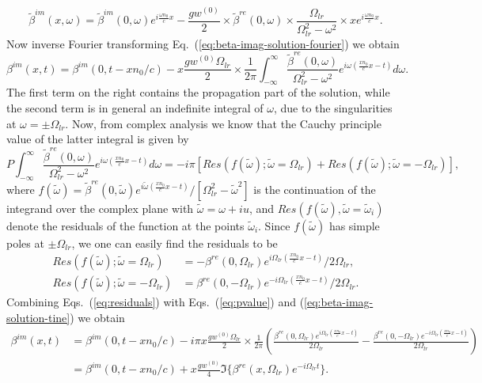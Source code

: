 \documentclass[onecolumn,secnumarabic,amssymb, nobibnotes, aip, prd]{revtex4-1}
\def\t{\tilde}
\def\om{\omega}
\begin{document}
\begin{appendices}
\begin{equation}
\label{eq:beta-imag-solution-fourier}
\t\beta^{im}(x,\om) = \t\beta^{im}(0,\om)e^{i\frac{\om n_0}{c}x} -\frac{g w^{(0)} }{2}\times  \t\beta^{re}(0,\om) \times\frac{\Omega_{lr}}{\Omega_{lr}^2-\om^2}\times x e^{i\frac{\om n_0}{c}x}.
\end{equation}
Now inverse Fourier transforming Eq.~(\ref{eq:beta-imag-solution-fourier}) we obtain
\begin{equation}
\label{eq:beta-imag-solution-tine}
\beta^{im}(x,t) = \beta^{im}(0,t-xn_0/c)  -x\frac{g w^{(0)} \Omega_{lr} }{2}\times \frac{1}{2\pi} \int_{-\infty}^{\infty} \frac{\t\beta^{re}(0,\om)}{\Omega_{lr}^2-\om^2} e^{i\om(\frac{x n_0}{c}x-t)}d\omega.
\end{equation}
The first term on the right contains the propagation part of the solution, while the second term is in general an indefinite integral of $\omega$, due to the singularities at $\omega = \pm \Omega_{lr}$. Now, from complex analysis we know that the Cauchy principle value of the latter integral is given by
\begin{equation}
\label{eq:pvalue}
P \int_{-\infty}^{\infty} \frac{\t\beta^{re}(0,\om)}{\Omega_{lr}^2-\om^2} e^{i\om(\frac{x n_0}{c}x-t)}d\omega = -i\pi \left[Res(f(\tilde\omega);\tilde\omega=\Omega_{lr})+Res(f(\tilde\omega);\tilde\omega=-\Omega_{lr})\right],
\end{equation}
where $f(\tilde\omega) = \t\beta^{re}(0,\tilde\omega) e^{i\tilde\omega(\frac{x n_0}{c}x-t)}/[\Omega_{lr}^2-\tilde\omega^2]$ is the continuation of the integrand over the complex plane with $\tilde\omega = \omega + iu$, and $Res(f(\tilde{\omega}),\tilde\omega=\tilde\omega_i)$ denote the residuals of the function at the points $\tilde\omega_i$. Since $f(\tilde\omega)$ has simple poles at $\pm\Omega_{lr}$, we one can easily find the residuals to be 
\begin{subequations}
\label{eq:residuals}
\begin{align}
Res(f(\tilde{\omega});\tilde{\omega}=\Omega_{lr}) &= - \beta^{re}(0,\Omega_{lr})e^{i\Omega_{lr}(\frac{x n_0}{c}x-t)}/2\Omega_{lr}, \\
Res(f(\tilde{\omega});\tilde{\omega}=-\Omega_{lr}) &= \beta^{re}(0,-\Omega_{lr})e^{-i\Omega_{lr}(\frac{x n_0}{c}x-t)}/2\Omega_{lr}.
\end{align}
\end{subequations}
Combining Eqs.~(\ref{eq:residuals}) with Eqs.~(\ref{eq:pvalue}) and (\ref{eq:beta-imag-solution-tine}) we obtain
\begin{subequations}
	\begin{align}
	\beta^{im}(x,t) &= \beta^{im}(0,t-xn_0/c)  -i\pi x\frac{g w^{(0)} \Omega_{lr} }{2}\times  \frac{1}{2\pi} \left( \frac{\beta^{re}(0,\Omega_{lr})e^{i\Omega_{lr}(\frac{x n_0}{c}x-t)}}{2\Omega_{lr}}-\frac{\beta^{re}(0,-\Omega_{lr})e^{-i\Omega_{lr}(\frac{x n_0}{c}x-t)}}{2\Omega_{lr}} \right) \nonumber \\
	&= \beta^{im}(0,t-xn_0/c)+ x\frac{g w^{(0)}}{4}\Im\{ \beta^{re}(x,\Omega_{lr})e^{-i\Omega_{lr}t}\}. 
	\end{align}
\end{subequations}


\end{appendices}
\end{document}
